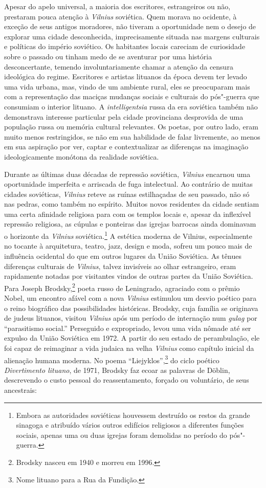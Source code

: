Apesar do apelo universal, a maioria dos escritores, estrangeiros ou
não, prestaram pouca atenção à \textit{Vilnius} soviética. Quem morava no
ocidente, à exceção de seus antigos moradores, não tiveram a
oportunidade nem o desejo de explorar uma cidade desconhecida,
imprecisamente situada nas margens culturais e políticas do império
soviético. Os habitantes locais careciam de curiosidade sobre o passado
ou tinham medo de se aventurar por uma história desconcertante, temendo
involuntariamente chamar a atenção da censura ideológica do regime.
Escritores e artistas lituanos da época devem ter levado uma vida
urbana, mas, vindo de um ambiente rural, eles se preocuparam mais com a
representação das maciças mudanças sociais e culturais do pós"-guerra que
consumiam o interior lituano. A \textit{intelligentsia} russa da era
soviética também não demonstrava interesse particular pela cidade
provinciana desprovida de uma população russa ou memória cultural
relevantes. Os poetas, por outro lado, eram muito menos restringidos, se
não em sua habilidade de falar livremente, ao menos em sua aspiração por
ver, captar e contextualizar as diferenças na imaginação ideologicamente
monótona da realidade soviética.

Durante as últimas duas décadas de repressão soviética, \textit{Vilnius} encarnou
uma oportunidade imperfeita e arriscada de fuga intelectual. Ao
contrário de muitas cidades soviéticas, \textit{Vilnius} reteve as ruínas
estilhaçadas de seu passado, não só nas pedras, como também no espírito.
Muitos novos residentes da cidade sentiam uma certa afinidade religiosa
para com os templos locais e, apesar da inflexível repressão religiosa,
as cúpulas e ponteiras das igrejas barrocas ainda dominavam o horizonte
da \textit{Vilnius} soviética.\footnote{Embora as autoridades soviéticas houvessem
destruído os restos da grande sinagoga e atribuído vários outros
edifícios religiosos a diferentes funções sociais, apenas uma ou duas
igrejas foram demolidas no período do pós"-guerra.} A estética moderna de
Vilnius, especialmente no tocante à arquitetura, teatro, jazz, design e
moda, sofreu um pouco mais de influência ocidental do que em outros
lugares da União Soviética. As tênues diferenças culturais de \textit{Vilnius},
talvez invisíveis ao olhar estrangeiro, eram rapidamente notadas por
visitantes vindos de outras partes da União Soviética. Para Joseph
Brodsky,\footnote{Brodsky nasceu em 1940 e morreu em 1996.} poeta russo de Leningrado, agraciado com o prêmio
Nobel, um encontro afável com a nova \textit{Vilnius} estimulou um desvio poético
para o reino biográfico das possibilidades históricas. Brodsky, cuja
família se originava de judeus lituanos, visitou \textit{Vilnius} após um período
de internação num \textit{gulag} por ``parasitismo social.'' Perseguido e
expropriado, levou uma vida nômade até ser expulso da União Soviética em
1972. A partir do seu estado de perambulação, ele foi capaz de
reimaginar a vida judaica na velha \textit{Vilnius} como capítulo inicial da
alienação humana moderna. No poema ``Liejyklos'',\footnote{Nome lituano para a
Rua da Fundição.} do ciclo poético \textit{Divertimento lituano}, de 1971,
Brodsky faz ecoar as palavras de Döblin, descrevendo o custo pessoal do
reassentamento, forçado ou voluntário, de seus ancestrais:

